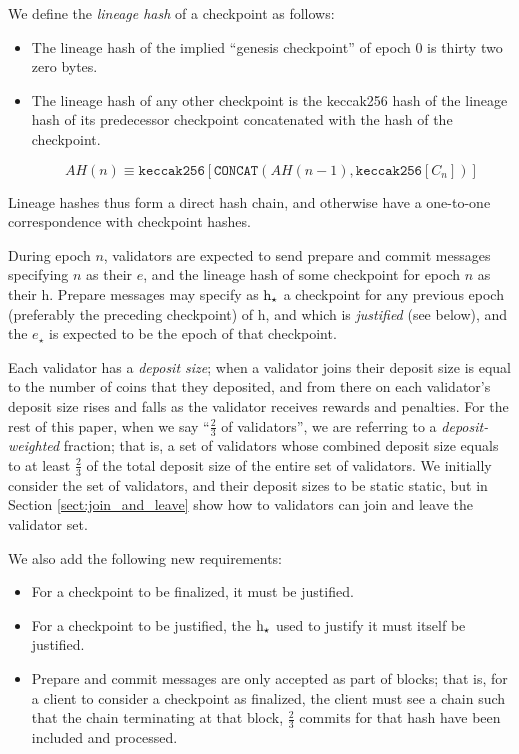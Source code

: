 \documentclass[12pt, final]{article}
\newcommand{\epoch}{\ensuremath{e}\xspace}
\newcommand{\hash}{\textnormal{h}\xspace}
\newcommand{\epochsource}{\ensuremath{\epoch_{\star}}\xspace}
\newcommand{\hashsource}{\ensuremath{\hash_{\star}}\xspace}
\begin{document}

We define the \textit{lineage hash} of a checkpoint as follows:

\begin{itemize}
\item The lineage hash of the implied ``genesis checkpoint'' of epoch 0 is thirty two zero bytes.
\item The lineage hash of any other checkpoint is the keccak256 hash  of the lineage hash of its predecessor checkpoint concatenated with the hash of the checkpoint.

\begin{equation}
AH(n) \equiv \texttt{keccak256}\left[ \texttt{CONCAT}\left( AH(n-1), \texttt{keccak256}[C_n] \right)\right]
\end{equation}

\end{itemize}

Lineage hashes thus form a direct hash chain, and otherwise have a one-to-one correspondence with checkpoint hashes.

During epoch $n$, validators are expected to send prepare and commit messages specifying $n$ as their \epoch, and the lineage hash of some checkpoint for epoch $n$ as their \hash. Prepare messages may specify as \hashsource a checkpoint for any previous epoch (preferably the preceding checkpoint) of \hash, and which is \textit{justified} (see below), and the \epochsource is expected to be the epoch of that checkpoint.

Each validator has a \textit{deposit size}; when a validator joins their deposit size is equal to the number of coins that they deposited, and from there on each validator's deposit size rises and falls as the validator receives rewards and penalties. For the rest of this paper, when we say ``$\frac{2}{3}$ of validators'', we are referring to a \textit{deposit-weighted} fraction; that is, a set of validators whose combined deposit size equals to at least $\frac{2}{3}$ of the total deposit size of the entire set of validators.  We initially consider the set of validators, and their deposit sizes to be static static, but in Section \ref{sect:join_and_leave} show how to validators can join and leave the validator set.


We also add the following new requirements:

\begin{itemize}
\item For a checkpoint to be finalized, it must be justified.
\item For a checkpoint to be justified, the \hashsource used to justify it must itself be justified.
\item Prepare and commit messages are only accepted as part of blocks; that is, for a client to consider a checkpoint as finalized, the client must see a chain  such that the chain terminating at that block, $\frac{2}{3}$ commits for that hash have been included and processed.
\end{itemize}
\end{document}
